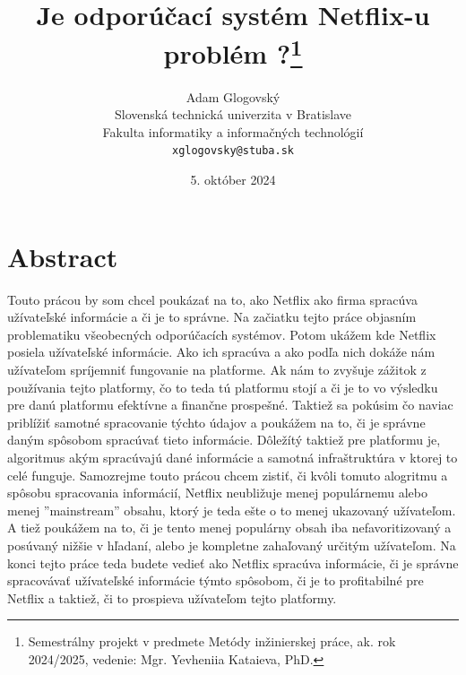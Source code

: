 \documentclass[10pt,twocolumn,twoside,slovak,a4paper]{article}
\title{Je odporúčací systém Netflix-u problém ?\thanks{Semestrálny projekt v predmete Metódy inžinierskej práce, ak. rok 2024/2025, vedenie: Mgr. Yevheniia Kataieva, PhD.}}
\author{Adam Glogovský\\[2pt]
	{\small Slovenská technická univerzita v Bratislave}\\
	{\small Fakulta informatiky a informačných technológií}\\
	{\small \texttt{xglogovsky@stuba.sk}}}
\date{\small 5. október 2024}
\begin{document}
\maketitle

\section*{Abstract}
Touto prácou by som chcel poukázať na to, ako Netflix ako firma spracúva užívateľské informácie a či je to správne. Na začiatku tejto práce objasním problematiku všeobecných odporúčacích systémov. Potom ukážem kde Netflix posiela užívateľské informácie. Ako ich spracúva a ako podľa nich dokáže nám užívateľom spríjemniť fungovanie na platforme. Ak nám to zvyšuje zážitok z používania tejto platformy, čo to teda tú platformu stojí a či je to vo výsledku pre danú platformu efektívne a finančne prospešné. Taktiež sa pokúsim čo naviac priblížiť samotné spracovanie týchto údajov a poukážem na to, či je správne daným spôsobom spracúvať tieto informácie.\cite{amatriain2015recommender} Dôležítý taktiež pre platformu je, algoritmus akým spracúvajú dané informácie a samotná infraštruktúra v ktorej to celé funguje. Samozrejme touto prácou chcem zistiť, či kvôli tomuto alogritmu a spôsobu spracovania informácií, Netflix neubližuje menej populárnemu alebo menej ''mainstream'' obsahu, ktorý je teda ešte o to menej ukazovaný užívateľom. A tiež poukážem na to, či je tento menej populárny obsah iba nefavoritizovaný a posúvaný nižšie v hľadaní, alebo je kompletne zahaľovaný určitým užívateľom. Na konci tejto práce teda budete vedieť ako Netflix spracúva informácie, či je správne spracovávať užívateľské informácie týmto spôsobom, či je to profitabilné pre Netflix a taktiež, či to prospieva užívateľom tejto platformy.
\end{document}
